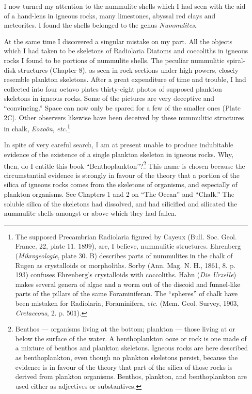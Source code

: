 \documentclass[a4paper, 12pt, oneside]{article}
\begin{document}
I now turned my attention to the nummulite shells which I had seen with the aid of a hand-lens in igneous rocks, many limestones, abyssal red clays and meteorites. I found the shells belonged to the genus \emph{Nummulites}.

At the same time I discovered a singular mistake on my part. All the objects which I had taken to be skeletons of Radiolaria Diatoms and coccoliths in igneous rocks I found to be portions of nummulite shells. The peculiar nummulitic spiral-disk structures (Chapter 8), as seen in rock-sections under high powers, closely resemble plankton skeletons. After a great expenditure of time and trouble, I had collected into four octavo plates thirty-eight photos of supposed plankton skeletons in igneous rocks. Some of the pictures are very deceptive and ``convincing.'' Space can now only be spared for a few of the smaller ones (Plate 2C). Other observers likewise have been deceived by these nummulitic structures in chalk, \emph{Eozoön}, \emph{etc.}\footnote{The supposed Precambrian Radiolaria figured by Cayeux (Bull. Soc. Geol. France, 22, plate 11. 1899), are, I believe, nummulitic structures. Ehrenberg (\emph{Mikrogeologie}, plate 30. B) describes parts of nummulites in the chalk of Rugen as crystalloids or morpholiths. Sorby (Ann. Mag. N. H., 1861, 8. p. 193) confuses Ehrenberg's crystalloids with coccoliths. Hahn (\emph{Die Urzelle}) makes several genera of algae and a worm out of the discoid and funnel-like parts of the pillars of the same Foraminiferan. The ``spheres'' of chalk have been mistaken for Radiolaria, Foraminifera, \emph{etc.} (Mem. Geol. Survey, 1903, \emph{Cretaceous}, 2. p. 501).}

In spite of very careful search, I am at present unable to produce indubitable evidence of the existence of a single plankton skeleton in igneous rocks. Why, then, do I entitle this book ``Benthoplankton''?\footnote{Benthos --- organisms living at the bottom; plankton --- those living at or below the surface of the water. A benthoplankton ooze or rock is one made of a mixture of benthos and plankton skeletons. Igneous rocks are here described as benthoplankton, even though no plankton skeletons persist, because the evidence is in favour of the theory that part of the silica of those rocks is derived from plankton organisms. Benthos, plankton, and benthoplankton are used either as adjectives or substantives.} This name is chosen because the circumstantial evidence is strongly in favour of the theory that a portion of the silica of igneous rocks comes from the skeletons of organisms, and especially of plankton organisms. See Chapters 1 and 2 on ``The Ocean'' and ``Chalk.'' The soluble silica of the skeletons had dissolved, and had silicified and silicated the nummulite shells amongst or above which they had fallen.
\end{document}
